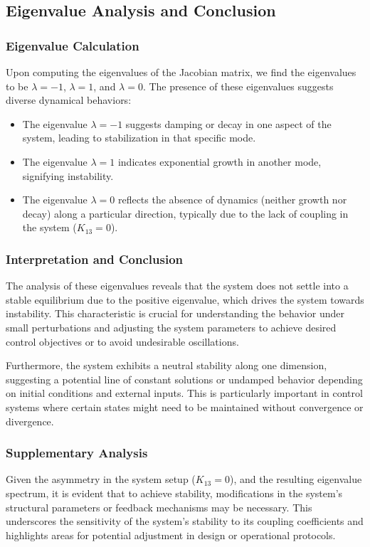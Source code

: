 \documentclass[12pt,a4paper]{article}
\begin{document}
\subsection{Eigenvalue Analysis and Conclusion}

\subsubsection{Eigenvalue Calculation}
Upon computing the eigenvalues of the Jacobian matrix, we find the eigenvalues to be \(\lambda = -1\), \(\lambda = 1\), and \(\lambda = 0\). The presence of these eigenvalues suggests diverse dynamical behaviors:

\begin{itemize}
    \item The eigenvalue \(\lambda = -1\) suggests damping or decay in one aspect of the system, leading to stabilization in that specific mode.
    \item The eigenvalue \(\lambda = 1\) indicates exponential growth in another mode, signifying instability.
    \item The eigenvalue \(\lambda = 0\) reflects the absence of dynamics (neither growth nor decay) along a particular direction, typically due to the lack of coupling in the system (\(K_{13} = 0\)).
\end{itemize}

\subsubsection{Interpretation and Conclusion}
The analysis of these eigenvalues reveals that the system does not settle into a stable equilibrium due to the positive eigenvalue, which drives the system towards instability. This characteristic is crucial for understanding the behavior under small perturbations and adjusting the system parameters to achieve desired control objectives or to avoid undesirable oscillations.

Furthermore, the system exhibits a neutral stability along one dimension, suggesting a potential line of constant solutions or undamped behavior depending on initial conditions and external inputs. This is particularly important in control systems where certain states might need to be maintained without convergence or divergence.

\subsubsection{Supplementary Analysis}
Given the asymmetry in the system setup (\(K_{13} = 0\)), and the resulting eigenvalue spectrum, it is evident that to achieve stability, modifications in the system's structural parameters or feedback mechanisms may be necessary. This underscores the sensitivity of the system's stability to its coupling coefficients and highlights areas for potential adjustment in design or operational protocols.
\end{document}
